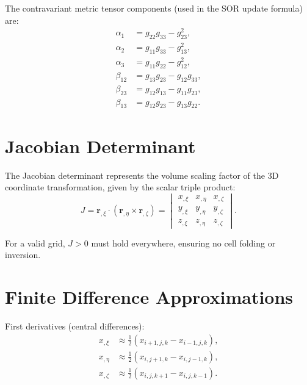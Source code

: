 \documentclass[11pt,a4paper]{report}
\newcommand{\rvec}{\bm{r}}
\begin{document}
The contravariant metric tensor components (used in the SOR update formula) are:
\begin{equation}
\begin{aligned}
    \alpha_1 &= g_{22} g_{33} - g_{23}^2, \\
    \alpha_2 &= g_{11} g_{33} - g_{13}^2, \\
    \alpha_3 &= g_{11} g_{22} - g_{12}^2, \\
    \beta_{12} &= g_{13} g_{23} - g_{12} g_{33}, \\
    \beta_{23} &= g_{12} g_{13} - g_{11} g_{23}, \\
    \beta_{13} &= g_{12} g_{23} - g_{13} g_{22}.
\end{aligned}
\end{equation}

\section{Jacobian Determinant}

The Jacobian determinant represents the volume scaling factor of the 3D coordinate transformation, given by the scalar triple product:
\begin{equation}
    J = \rvec_{,\xi} \cdot (\rvec_{,\eta} \times \rvec_{,\zeta})
      = \begin{vmatrix} x_{,\xi} & x_{,\eta} & x_{,\zeta} \\
                         y_{,\xi} & y_{,\eta} & y_{,\zeta} \\
                         z_{,\xi} & z_{,\eta} & z_{,\zeta} \end{vmatrix}.
\end{equation}

For a valid grid, $J > 0$ must hold everywhere, ensuring no cell folding or inversion.

\section{Finite Difference Approximations}

First derivatives (central differences):
\begin{equation}
\begin{aligned}
    x_{,\xi} &\approx \frac{1}{2}(x_{i+1,j,k} - x_{i-1,j,k}), \\
    x_{,\eta} &\approx \frac{1}{2}(x_{i,j+1,k} - x_{i,j-1,k}), \\
    x_{,\zeta} &\approx \frac{1}{2}(x_{i,j,k+1} - x_{i,j,k-1}).
\end{aligned}
\end{equation}
\end{document}
